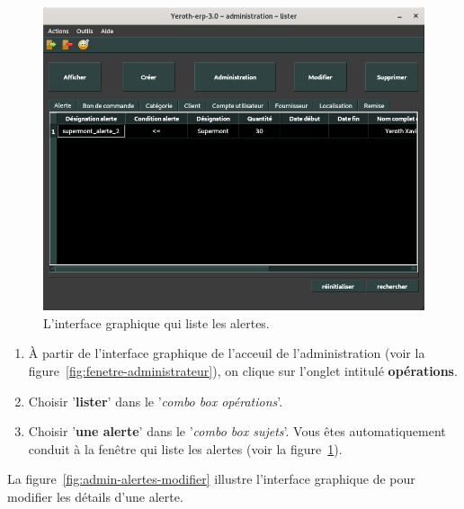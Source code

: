 \begin{figure}[!htpb]
	\centering
	\includegraphics[scale=0.45]{images/alerte-lister.png}
	\caption{L'interface graphique qui liste les alertes.}
	\label{fig:admin-alertes-lister}
\end{figure}

\begin{enumerate}[1)]
	\item \`A partir de l'interface graphique de l'acceuil de
		l'administration (voir la figure~\ref{fig:fenetre-administrateur}),
		on clique sur l'onglet intitul\'e \textbf{op\'erations}. 
		
	\item Choisir '\textbf{lister}' dans le '\emph{combo box
		op\'erations}'.
		
	\item Choisir '\textbf{une alerte}' dans le '\emph{combo box
		sujets}'. Vous \^etes automatiquement conduit \`a la fen\^etre
		qui liste les alertes (voir la figure~\ref{fig:admin-alertes-lister}).
\end{enumerate}


\newpage
{}

La figure~\ref{fig:admin-alertes-modifier} illustre
l'interface graphique de \yeren pour modifier les
d\'etails d'une alerte.\\

